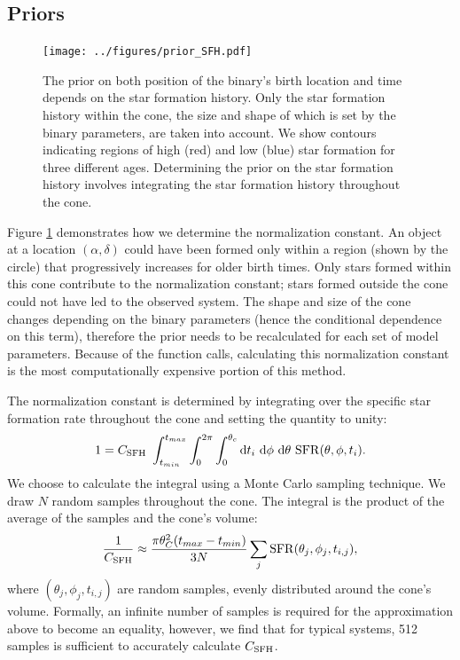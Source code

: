 \documentclass[usenatbib]{mnras}
\newcommand{\dd}{\mathrm{d}}
\begin{document}
\subsection{Priors} \label{sec:priors_indiv}


\begin{figure}
\begin{center}
\texttt{[image: ../figures/prior\_SFH.pdf]}
\caption{The prior on both position of the binary's birth location and time depends on the star formation history. Only the star formation history within the cone, the size and shape of which is set by the binary parameters, are taken into account. We show contours indicating regions of high (red) and low (blue) star formation for three different ages. Determining the prior on the star formation history involves integrating the star formation history throughout the cone.}
\label{fig:prior_SFH}
\end{center}
\end{figure}

Figure \ref{fig:prior_SFH} demonstrates how we determine the normalization constant. An object at a location $(\alpha, \delta)$ could have been formed only within a region (shown by the circle) that progressively increases for older birth times. Only stars formed within this cone contribute to the normalization constant; stars formed outside the cone could not have led to the observed system. The shape and size of the cone changes depending on the binary parameters (hence the conditional dependence on this term), therefore the prior needs to be recalculated for each set of model parameters. Because of the function calls, calculating this normalization constant is the most computationally expensive portion of this method. 

The normalization constant is determined by integrating over the specific star formation rate throughout the cone and setting the quantity to unity:
\begin{equation}
1 = C_{\rm SFH}\ \int_{t_{min}}^{t_{max}} \int_0^{2 \pi} \int_0^{\theta_c} \dd t_i\ \dd \phi\ \dd \theta\ {\rm SFR}(\theta, \phi, t_i). 
\end{equation}
We choose to calculate the integral using a Monte Carlo sampling technique. We draw $N$ random samples throughout the cone. The integral is the product of the average of the samples and the cone's volume:
\begin{equation}
\frac{1}{C_{\rm SFH}} \approx \frac{\pi \theta_C^2 (t_{max} - t_{min})}{3N} \sum_j {\rm SFR}(\theta_j, \phi_j, t_{i,j}),
\end{equation}
where $(\theta_j, \phi_j, t_{i,j})$ are random samples, evenly distributed around the cone's volume. Formally, an infinite number of samples is required for the approximation above to become an equality, however, we find that for typical systems, 512 samples is sufficient to accurately calculate $C_{\rm SFH}$.
\end{document}
